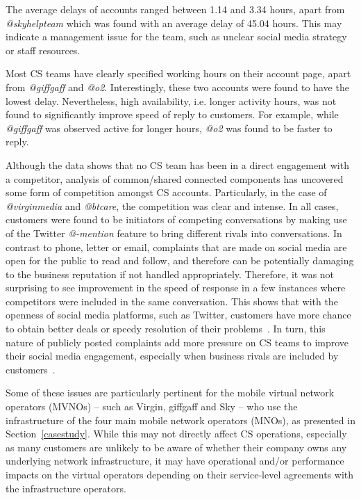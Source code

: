 \documentclass[sigconf]{acmart}
\begin{document}
{The average delays of accounts ranged between 1.14 and
3.34 hours, apart from {\emph{@skyhelpteam}} which was found with an average
delay of 45.04 hours. This may indicate a management issue for the
team, such as unclear social media strategy or staff resources. 

Most CS teams have clearly specified working hours on their account
page, apart from {\emph{@giffgaff}} and {\emph{@o2}}. Interestingly,
these two accounts were found to have the lowest delay. Nevertheless,
high availability, i.e. longer activity hours, was not found to
significantly improve speed of reply to customers. For example, while
{\emph{@giffgaff}} was observed active for longer hours, {\emph{@o2}}
was found to be faster to reply.

Although the data shows that no CS team has been in a direct
engagement with a competitor, analysis of common/shared connected
components has uncovered some form of competition amongst CS
accounts. Particularly, in the case of {\emph{@virginmedia}} and
{\emph{@btcare}}, the competition was clear and intense. In all cases,
customers were found to be initiators of competing conversations by
making use of the Twitter {\emph{@-mention}} feature to bring
different rivals into conversations. In contrast to phone, letter or
email, complaints that are made on social media are open for the
public to read and follow, and therefore can be potentially damaging
to the business reputation if not handled appropriately. Therefore, it
was not surprising to see improvement in the speed of response in a
few instances where competitors were included in the same
conversation. This shows that with the openness of social media
platforms, such as Twitter, customers have more chance to obtain
better deals or speedy resolution of their
problems~\cite{einwiller+steilen:2015}. In turn, this nature of
publicly posted complaints add more pressure on CS teams to improve
their social media engagement, especially when business rivals are
included by customers~\cite{gregoire-et-al:2015}. 

Some of these issues are particularly pertinent for the mobile virtual
network operators (MVNOs) -- such as Virgin, giffgaff and Sky -- who
use the infrastructure of the four main mobile network operators
(MNOs), as presented in Section~\ref{casestudy}. While this may not
directly affect CS operations, especially as many customers are
unlikely to be aware of whether their company owns any underlying
network infrastructure, it may have operational and/or performance
impacts on the virtual operators depending on their service-level
agreements with the infrastructure operators.

}
\end{document}
